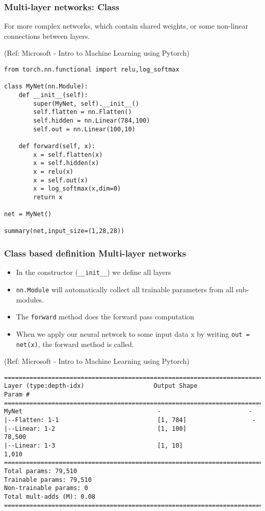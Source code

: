 \begin{frame}[fragile] \frametitle{Multi-layer networks: Class}

For more complex networks, which contain shared weights, or some non-linear connections between layers.

\tiny{(Ref: Microsoft - Intro to Machine Learning using Pytorch)}

\begin{lstlisting}
from torch.nn.functional import relu,log_softmax

class MyNet(nn.Module):
    def __init__(self):
        super(MyNet, self).__init__()
        self.flatten = nn.Flatten()
        self.hidden = nn.Linear(784,100)
        self.out = nn.Linear(100,10)

    def forward(self, x):
        x = self.flatten(x)
        x = self.hidden(x)
        x = relu(x)
        x = self.out(x)
        x = log_softmax(x,dim=0)
        return x

net = MyNet()

summary(net,input_size=(1,28,28))
\end{lstlisting}


\end{frame}

\begin{frame}[fragile] \frametitle{Class based definition Multi-layer networks}

\begin{itemize}
\item In the constructor (\lstinline|__init__|) we define all layers
\item \lstinline|nn.Module| will automatically collect all trainable parameters from all sub-modules.
\item The \lstinline|forward| method does the forward pass computation 
\item When we apply our neural network to some input data x by writing \lstinline|out = net(x)|, the forward method is called.
\end{itemize}

\tiny{(Ref: Microsoft - Intro to Machine Learning using Pytorch)}

\begin{lstlisting}
==========================================================================
Layer (type:depth-idx)                   Output Shape              Param #
==========================================================================
MyNet                                     -                        -
|--Flatten: 1-1                           [1, 784]                  -
|--Linear: 1-2                            [1, 100]                  78,500
|--Linear: 1-3                            [1, 10]                   1,010
==========================================================================
Total params: 79,510
Trainable params: 79,510
Non-trainable params: 0
Total mult-adds (M): 0.08
==========================================================================
\end{lstlisting}


\end{frame}

